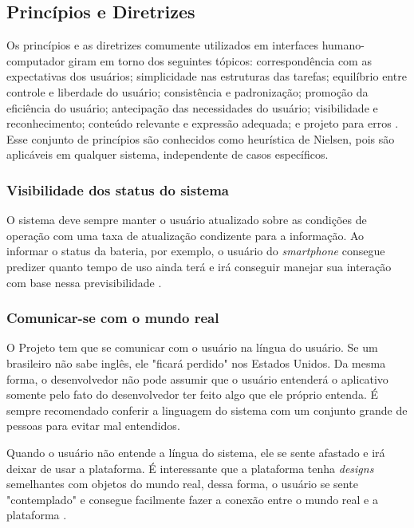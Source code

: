 \subsection{Princípios e Diretrizes}

Os princípios e as diretrizes comumente utilizados em interfaces humano-computador giram em torno dos seguintes tópicos: correspondência com as expectativas dos usuários; simplicidade nas estruturas das tarefas; equilíbrio entre controle e liberdade do usuário; consistência e padronização; promoção da eficiência do usuário; antecipação das necessidades do usuário; visibilidade e reconhecimento; conteúdo relevante e expressão adequada; e projeto para erros \cite{BarbosaEtAl2021InteracaoHumanoComputadorExperiencia}.
Esse conjunto de princípios são conhecidos como heurística de Nielsen, pois são aplicáveis em qualquer sistema, independente de casos específicos.

\subsubsection{Visibilidade dos status do sistema}

O sistema deve sempre manter o usuário atualizado sobre as condições de operação com uma taxa de atualização condizente para a informação. Ao informar o status da bateria, por exemplo, o usuário do \textit{smartphone} consegue predizer quanto tempo de uso ainda terá e irá conseguir manejar sua interação com base nessa previsibilidade \cite{site:nielsen}.

\subsubsection{Comunicar-se com o mundo real}
O Projeto tem que se comunicar com o usuário na língua do usuário. Se um brasileiro não sabe inglês, ele "ficará perdido" nos Estados Unidos. Da mesma forma, o desenvolvedor não pode assumir que o usuário entenderá o aplicativo somente pelo fato do desenvolvedor ter feito algo que ele próprio entenda. É sempre recomendado conferir a linguagem do sistema com um conjunto grande de pessoas para evitar mal entendidos.

Quando o usuário não entende a língua do sistema, ele se sente afastado e irá deixar de usar a plataforma. É interessante que a plataforma tenha \textit{designs} semelhantes com objetos do mundo real, dessa forma, o usuário se sente "contemplado" e consegue facilmente fazer a conexão entre o mundo real e a plataforma \cite{site:nielsenRealWorld}.

